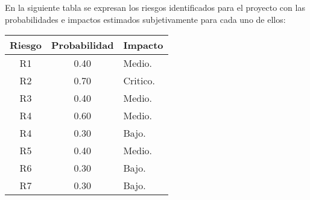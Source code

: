 \documentclass[12pt,a4paper]{article}
\begin{document}
En la siguiente tabla se expresan los riesgos identificados para el proyecto con las
probabilidades e impactos estimados subjetivamente para cada uno de ellos: 
\vspace{1 cm}
\begin{table}[h!]
\begin{tabular}{|c|c|p{8cm}|}
\hline
\textbf{Riesgo}&\textbf{Probabilidad}&\textbf{Impacto}
\\\hline
R1&0.40&Medio.\\\hline
R2&0.70&Critico.\\\hline
R3&0.40&Medio.\\\hline
R4&0.60&Medio.\\\hline
R4&0.30&Bajo.\\\hline
R5&0.40&Medio.\\\hline
R6&0.30&Bajo.\\\hline
R7&0.30&Bajo.\\\hline
\end{tabular}
\end{table}
\end{document}
